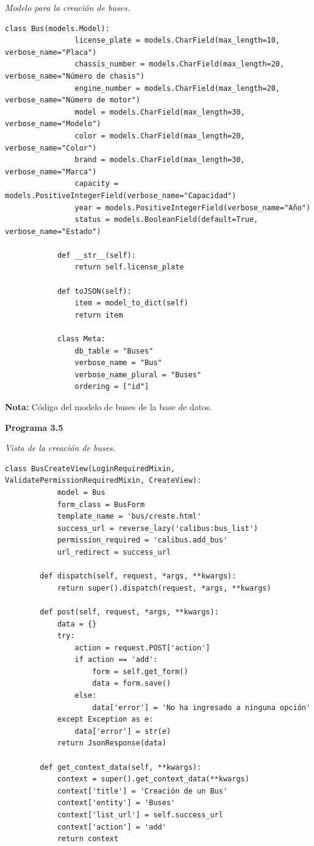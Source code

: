 	\textit{Modelo para la creación de buses.} %
	\vspace{0.3cm} %
		\begin{lstlisting}[lineskip=-1pt]
			class Bus(models.Model):
				license_plate = models.CharField(max_length=10, verbose_name="Placa")
				chassis_number = models.CharField(max_length=20, verbose_name="Número de chasis")
				engine_number = models.CharField(max_length=20, verbose_name="Número de motor")
				model = models.CharField(max_length=30, verbose_name="Modelo")
				color = models.CharField(max_length=20, verbose_name="Color")
				brand = models.CharField(max_length=30, verbose_name="Marca")
				capacity = models.PositiveIntegerField(verbose_name="Capacidad")
				year = models.PositiveIntegerField(verbose_name="Año")
				status = models.BooleanField(default=True, verbose_name="Estado")
			
			def __str__(self):
				return self.license_plate
			
			def toJSON(self):
				item = model_to_dict(self)
				return item
			
			class Meta:
				db_table = "Buses"
				verbose_name = "Bus"
				verbose_name_plural = "Buses"
				ordering = ["id"]
		\end{lstlisting}
	
	\textbf{Nota:} Código del modelo de buses de la base de datos.
	
	\textbf{Programa 3.5}
	
	\textit{Vista de la creación de buses.} %
	\vspace{0.3cm} %
	\begin{lstlisting}[lineskip=-1pt]
		class BusCreateView(LoginRequiredMixin, ValidatePermissionRequiredMixin, CreateView):
			model = Bus
			form_class = BusForm
			template_name = 'bus/create.html'
			success_url = reverse_lazy('calibus:bus_list')
			permission_required = 'calibus.add_bus'
			url_redirect = success_url
		
		def dispatch(self, request, *args, **kwargs):
			return super().dispatch(request, *args, **kwargs)
		
		def post(self, request, *args, **kwargs):
			data = {}
			try:
				action = request.POST['action']
				if action == 'add':
					form = self.get_form()
					data = form.save()
				else:
					data['error'] = 'No ha ingresado a ninguna opción'
			except Exception as e:
				data['error'] = str(e)
			return JsonResponse(data)
		
		def get_context_data(self, **kwargs):
			context = super().get_context_data(**kwargs)
			context['title'] = 'Creación de un Bus'
			context['entity'] = 'Buses'
			context['list_url'] = self.success_url
			context['action'] = 'add'
			return context
	\end{lstlisting}
	
